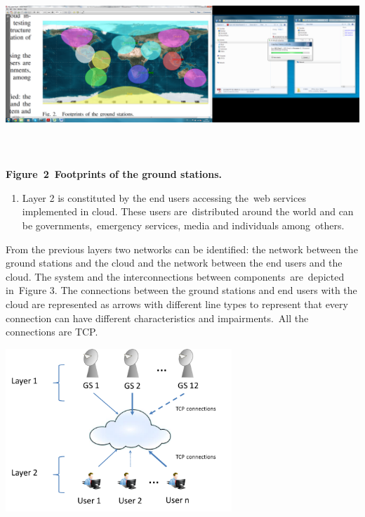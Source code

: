 \documentclass[a4paper]{article}
\newcounter{saveenum}
\newcommand\liststyleLFOv{%
\renewcommand\theenumi{\arabic{enumi}}
\renewcommand\labelenumi{\theenumi.}
\renewcommand\labelitemi{o}
\renewcommand\labelitemii{[F0A7?]}
\renewcommand\labelitemiii{[F0B7?]}
}
\begin{document}
\bigskip

{\centering 
\includegraphics[width=5.37767in,height=2.68448in]{ple-img4.png} \par}

{\centering\bfseries
Figure\ 2\ Footprints of the ground stations.
\par}

\liststyleLFOv
\setcounter{saveenum}{\value{enumi}}
\begin{enumerate}
\setcounter{enumi}{\value{saveenum}}
\item Layer 2 is constituted by the end users accessing the\ web
services implemented in cloud. These users are\ distributed around the
world and can be governments,\ emergency services, media and
individuals among\ others.
\end{enumerate}
From the previous layers two networks can be identified: the network
between the ground stations and the cloud and the network between the
end users and the cloud. The system and the interconnections between
components\ are\ depicted in\ Figure 3. The connections between the
ground stations and end users with the cloud are represented as arrows
with different line types to represent that every connection can have
different characteristics and impairments.\ All the connections are
TCP.

{\centering 
\includegraphics[width=3.35852in,height=2.41008in]{ple-img5.png} \par}
\end{document}
